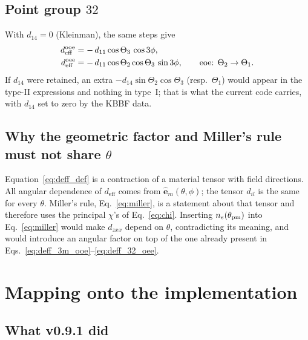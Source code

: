 \documentclass[aps,pra,preprint,amsmath,amssymb,nofootinbib,superscriptaddress]{revtex4-2}
\newcommand{\ueff}{d_{\mathrm{eff}}}
\newcommand{\vecu}[1]{\hat{\bm{#1}}}
\begin{document}
\subsection{Point group $32$}

With $d_{14}=0$ (Kleinman), the same steps give
\begin{align}
  \ueff^{\rm ooe} &= -\,d_{11}\cos\Theta_3\,\cos3\phi, \label{eq:deff_32_ooe}\\
  \ueff^{\rm oee} &= -\,d_{11}\cos\Theta_2\cos\Theta_3\,\sin3\phi,
  \qquad \text{eoe: } \Theta_2\to\Theta_1 . \label{eq:deff_32_oee}
\end{align}
If $d_{14}$ were retained, an extra $-d_{14}\sin\Theta_2\cos\Theta_3$
(resp.\ $\Theta_1$) would appear in the type-II expressions and nothing in
type~I; that is what the current code carries, with $d_{14}$ set to zero
by the KBBF data.

\subsection{Why the geometric factor and Miller's rule must not share $\theta$}

Equation~\eqref{eq:deff_def} is a contraction of a material tensor with
field directions. All angular dependence of $\ueff$ comes from
$\vecu e_m(\theta,\phi)$; the tensor $d_{il}$ is the same for every
$\theta$. Miller's rule, Eq.~\eqref{eq:miller}, is a statement about that
tensor and therefore uses the principal $\chi$'s of Eq.~\eqref{eq:chi}.
Inserting $n_e(\theta_{\rm pm})$ into Eq.~\eqref{eq:miller} would make
$d_{zxx}$ depend on $\theta$, contradicting its meaning, and would
introduce an angular factor on top of the one already present in
Eqs.~\eqref{eq:deff_3m_ooe}--\eqref{eq:deff_32_oee}.

\section{Mapping onto the implementation}
\label{sec:impl}

\subsection{What v0.9.1 did}
\end{document}
